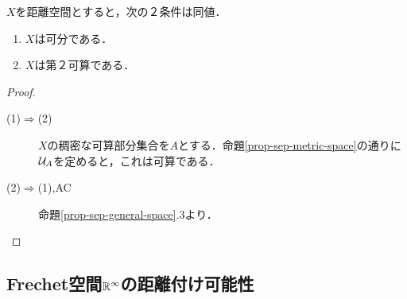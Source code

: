 \documentclass[uplatex,dvipdfmx]{jsreport}
\begin{document}
\begin{corollary}\label{cor-separability-and-second-countability}
    $X$を距離空間とすると，次の２条件は同値．
    \begin{enumerate}
        \item $X$は可分である．
        \item $X$は第２可算である．
    \end{enumerate}
\end{corollary}
\begin{proof}\mbox{}
    \begin{description}
        \item[(1)$\Rightarrow$(2)] $X$の稠密な可算部分集合を$A$とする．命題\ref{prop-sep-metric-space}の通りに$\mathcal{U}_A$を定めると，これは可算である．
        \item[(2)$\Rightarrow$(1),AC] 命題\ref{prop-sep-general-space}.3より．
    \end{description}
\end{proof}

\subsection{Frechet空間$\mathbb{R}^\infty$の距離付け可能性}
\end{document}

